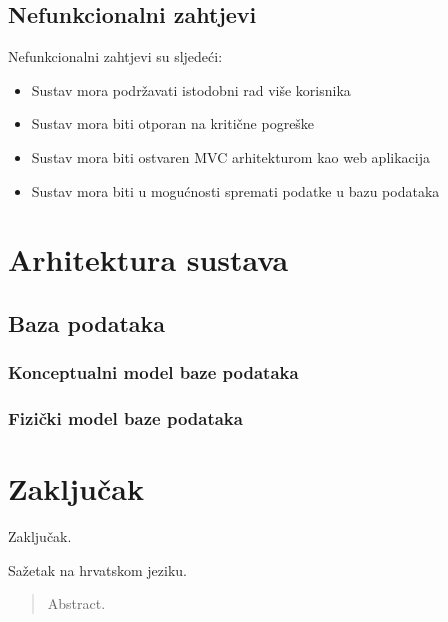 \documentclass[times, utf8, zavrsni]{fer}
\begin{document}
\section{Nefunkcionalni zahtjevi}
Nefunkcionalni zahtjevi su sljedeći:

\begin{itemize}
  \item Sustav mora podržavati istodobni rad više korisnika
  \item Sustav mora biti otporan na kritične pogreške
  \item Sustav mora biti ostvaren MVC arhitekturom kao web aplikacija
  \item Sustav mora biti u mogućnosti spremati podatke u bazu podataka
\end{itemize}

\chapter{Arhitektura sustava}
\section{Baza podataka}
\subsection{Konceptualni model baze podataka}

\subsection{Fizički model baze podataka}



\chapter{Zaključak}
Zaključak.




\begin{sazetak}
Sažetak na hrvatskom jeziku.

\end{sazetak}

\begin{abstract}
Abstract.

\end{abstract}
\end{document}
